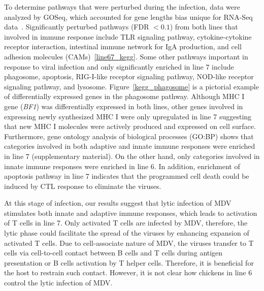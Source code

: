 \documentclass[10pt]{article}
\begin{document}
To determine pathways that were perturbed during the infection, data were
analyzed by GOSeq, which accounted for gene lengths bias unique for RNA-Seq
data~\cite{young2010method}.  Significantly perturbed pathways (FDR $< 0.1$)
from both lines that involved in immune response include TLR signaling pathway,
cytokine-cytokine receptor interaction, intestinal immune network for IgA
production, and cell adhesion molecules (CAMs)~\ref{line67_kegg}.  Some other
pathways important in response to viral infection and only significantly
enriched in line 7 include phagosome, apoptosis, RIG-I-like receptor signaling
pathway, NOD-like receptor signaling pathway, and lysosome.
Figure~\ref{kegg_phagosome} is a pictorial example of differentially expressed
genes in the phagosome pathway.  Although MHC I gene ({\em BF1}) was
differentially expressed in both lines, other genes involved in expressing newly
synthesized MHC I were only upregulated in line 7 suggesting that new MHC I
molecules were actively produced and expressed on cell surface.
Furthermore, gene ontology analysis of biological processes (GO:BP) shows that
categories involved in both adaptive and innate immune responses were enriched
in line 7 (supplementary material).  On the other hand, only categories involved
in innate immune responses were enriched in line 6.  In addition, enrichment of
apoptosis pathway in line 7 indicates that the programmed cell death could be
induced by CTL response to eliminate the viruses.

At this stage of infection, our results suggest that lytic infection of MDV
stimulates both innate and adaptive immune responses, which leads to activation
of T cells in line 7.  Only activated T cells are infected by MDV, therefore,
the lytic phase could facilitate the spread of the viruses by enhancing
expansion of activated T cells.  Due to cell-associate nature of MDV, the
viruses transfer to T cells via cell-to-cell contact between B cells and T cells
during antigen presentation or B cells activation by T helper cells.  Therefore,
it is beneficial for the host to restrain such contact.  However, it is not
clear how chickens in line 6 control the lytic infection of MDV.
\end{document}

